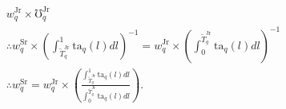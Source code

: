 \documentclass[hidelinks, nonatbib]{elsarticle}
\begin{document}
\begin{enumerate}
\begin{gather}
        w_{q}^{\text{Jr}} \times 
        \mho_{q}^{\text{Jr}}
        \\
        \therefore
        w_{q}^{\text{Sr}} \times 
        \left(
            \int_{\tilde{T}_{q}^{\text{Jr}}}^{1}
                \text{ta}_q(l)
                dl
        \right) ^ {-1}
        = 
        w_{q}^{\text{Jr}} \times 
        \left(
            \int_{0}^{\tilde{T}_{q}^{\text{Jr}}}
                \text{ta}_q(l)
                dl
        \right) ^ {-1}
        \\
        \therefore
        w_{q}^{\text{Sr}}
        = 
        w_{q}^{\text{Jr}}
        \times
        \left(
            \frac{
                \int_{\tilde{T}_{q}^{\text{Jr}}}^{1}
                    \text{ta}_q(l)
                    dl
            }{
                \int_{0}^{\tilde{T}_{q}^{\text{Jr}}}
                    \text{ta}_q(l)
                    dl
            }
        \right)
        .
    \end{gather}


\end{enumerate}
\end{document}
